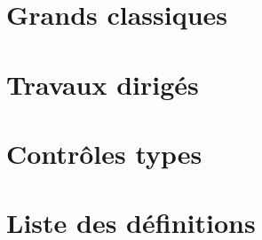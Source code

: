 \documentclass[11pt,a4paper,landscape,colorlinks,breaklinks]{book}
\theoremstyle{mybreak}
\begin{document}
\appendix
{}

\chapter{Grands classiques}\label{ch:classiques}
	\renewcommand{\lstlistingname}{Algorithme}
	

\chapter{Travaux dirigés}\label{ch:exercices}
	

\chapter{Contrôles types}\label{ch:annales}
	

\setlength{\textwidth}{25cm}
\setlength{\textheight}{16cm}
\setlength{\marginparwidth}{0cm}
\setlength{\marginparsep}{0cm}
\setlength{\linewidth}{25cm}
\setlength{\oddsidemargin}{0cm}
\setlength{\evensidemargin}{0cm}
\setlength{\topmargin}{-0.75cm}

\printindex\label{ch:index}
\printindex[def]\label{index:def}
\printindex[td]\label{index:td}
\printindex[algo]\label{index:algo}

\chapter*{Liste des définitions}
\end{document}
